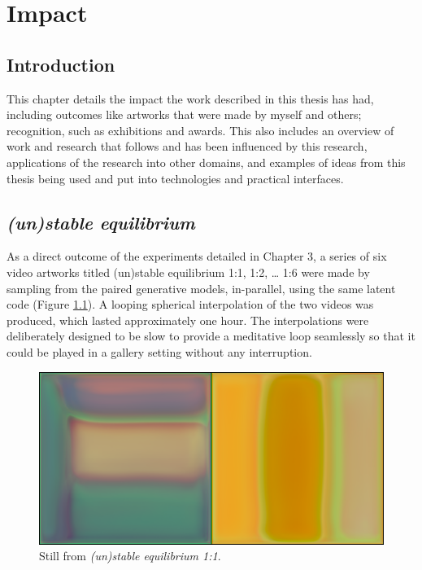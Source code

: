 \chapter{Impact}
\label{ch:impact}

\section{Introduction}

This chapter details the impact the work described in this thesis has had, including outcomes like artworks that were made by myself and others; recognition, such as exhibitions and awards. 
This also includes an overview of work and research that follows and has been influenced by this research, applications of the research into other domains, and examples of ideas from this thesis being used and put into technologies and practical interfaces. 

\section{\textit{(un)stable equilibrium}}

As a direct outcome of the experiments detailed in Chapter 3, a series of six video artworks titled (un)stable equilibrium 1:1, 1:2, … 1:6 were made by sampling from the paired generative models, in-parallel, using the same latent code (Figure \ref{fig:c7:ue_still}). 
A looping spherical interpolation \citep{white2016sampling} of the two videos was produced, which lasted approximately one hour. 
The interpolations were deliberately designed to be slow to provide a meditative loop seamlessly so that it could be played in a gallery setting without any interruption.

\begin{figure}[!htb]
    \centering
    \captionsetup{justification=centering}
    \includegraphics[width=1\textwidth]{figures/c7_impact/ue_1_1_still.png}
    \caption{Still from \textit{(un)stable equilibrium 1:1}.}
    \label{fig:c7:ue_still}
\end{figure}

